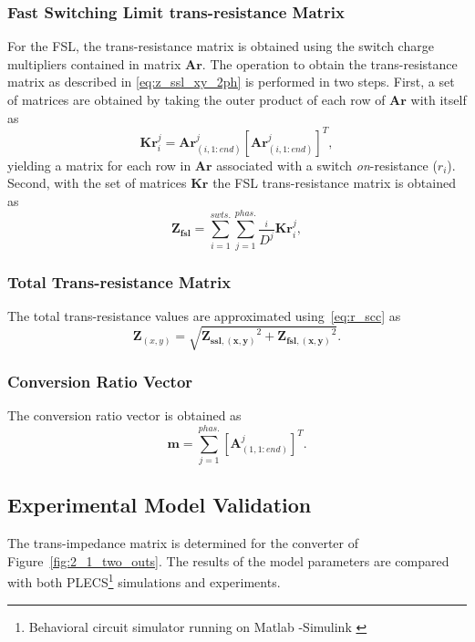 \subsubsection{Fast Switching Limit trans-resistance Matrix}
For the FSL, the trans-resistance matrix is obtained using the switch charge multipliers
contained in matrix $\mathbf{Ar}$. The operation to obtain the trans-resistance matrix as described
in \eqref{eq:z_ssl_xy_2ph} is performed in two steps. First, a set of matrices are obtained by taking the outer product
of each row of $\mathbf{Ar}$ with itself as
\begin{equation}
 \mathbf{Kr}_i^j = \mathbf{Ar}_{(i,1:end)}^j [\mathbf{Ar}_{(i,1:end)}^j]^T,
 \label{eq:Kr_matrix}
\end{equation}
yielding a matrix for each row in $\mathbf{Ar}$ associated with a switch \emph{on}-resistance ($r_{i}$). Second, with the set of matrices $\mathbf{Kr}$ the FSL trans-resistance matrix is obtained as
\begin{equation}
 \mathbf{Z_{fsl}} =  \sum_{i=1}^{swts.} \sum_{j=1}^{phas.} \frac{_{i}}{D^j}
\mathbf{Kr}_i^j ,
 \label{eq:G_fsl}
\end{equation}

\subsubsection{Total Trans-resistance Matrix}
The total trans-resistance values are approximated using~\eqref{eq:r_scc} as
\begin{equation}
 \mathbf{Z}_{(x,y)} = \sqrt{\mathbf{Z_{ssl,(x,y)}}^2 + \mathbf{Z_{fsl,(x,y)}}^2}.
 \label{eq:G_total}
\end{equation}

\subsubsection{Conversion Ratio Vector }

The conversion ratio vector is obtained as
\begin{equation}
 \mathbf{m} = \sum_{j=1}^{phas.}[\mathbf{A}^j_{(1,1:end)}]^T.
 \label{eq:m_equation}
\end{equation}

\subsection{Experimental Model Validation}

The trans-impedance matrix is determined for the converter of Figure~\ref{fig:2_1_two_outs}. The results of the model parameters are compared with both  PLECS\footnote[1]{Behavioral circuit simulator running on Matlab \textsuperscript{\textregistered}-Simulink \textsuperscript{\textregistered}} simulations and experiments.

